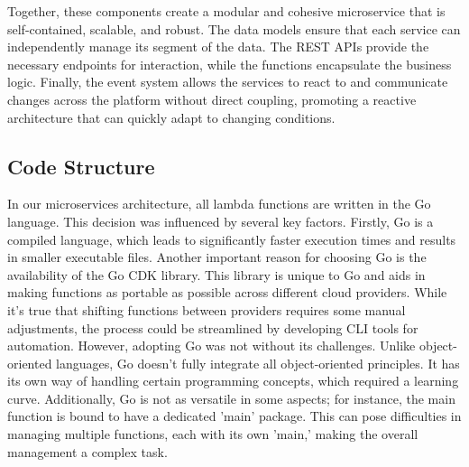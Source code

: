 Together, these components create a modular and cohesive microservice that is self-contained,
scalable, and robust. The data models ensure that each service can independently manage its segment
of the data. The REST APIs provide the necessary endpoints for interaction, while the functions
encapsulate the business logic. Finally, the event system allows the services to react to and
communicate changes across the platform without direct coupling, promoting a reactive architecture
that can quickly adapt to changing conditions.

\subsection{Code Structure}
In our microservices architecture, all lambda functions are written in the Go language. This
decision was influenced by several key factors. Firstly, Go is a compiled language, which leads to
significantly faster execution times and results in smaller executable files. Another important
reason for choosing Go is the availability of the Go CDK library. This library is unique to Go and
aids in making functions as portable as possible across different cloud providers. While it's true
that shifting functions between providers requires some manual adjustments, the process could be
streamlined by developing CLI tools for automation.
\newline\newline
However, adopting Go was not without its challenges. Unlike object-oriented languages, Go doesn't
fully integrate all object-oriented principles. It has its own way of handling certain programming
concepts, which required a learning curve. Additionally, Go is not as versatile in some aspects; for
instance, the main function is bound to have a dedicated 'main' package. This can pose difficulties
in managing multiple functions, each with its own 'main,' making the overall management a complex
task.

